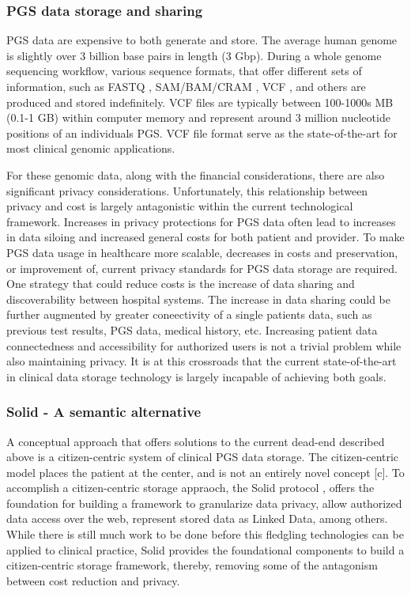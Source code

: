 \documentclass[runningheads]{llncs}
\begin{document}
\subsubsection{PGS data storage and sharing} 
PGS data are expensive to both generate and store. 
The average human genome is slightly over 3 billion base pairs in length (3 Gbp). 
During a whole genome sequencing workflow, various sequence formats, that offer different sets of information, such as FASTQ \cite{cock_sanger_2010}, SAM/BAM/CRAM \cite{li_sequence_2009}\cite{bonfield_cram_2022}, VCF \cite{danecek_variant_2011}, and others are produced and stored indefinitely. 
VCF files are typically between 100-1000s MB (0.1-1 GB) within computer memory and represent around 3 million nucleotide positions of an individual\textquotesingle s PGS. 
VCF file format serve as the state-of-the-art for most clinical genomic applications.

For these genomic data, along with the financial considerations, there are also significant privacy considerations.
Unfortunately, this relationship between privacy and cost is largely antagonistic within the current technological framework.
Increases in privacy protections for PGS data often lead to increases in data siloing and increased general costs for both patient and provider.
To make PGS data usage in healthcare more scalable, decreases in costs and preservation, or improvement of, current privacy standards for PGS data storage are required.
One strategy that could reduce costs is the increase of data sharing and discoverability between hospital systems.
The increase in data sharing could be further augmented by greater coneectivity of a single patient\textquotesingle s data, such as previous test results, PGS data, medical history, etc.
Increasing patient data connectedness and accessibility for authorized users is not a trivial problem while also maintaining privacy.
It is at this crossroads that the current state-of-the-art in clinical data storage technology is largely incapable of achieving both goals.

\subsubsection{Solid - A semantic alternative} 
A conceptual approach that offers solutions to the current dead-end described above is a citizen-centric system of clinical PGS data storage. 
The citizen-centric model places the patient at the center, and is not an entirely novel concept [c].
To accomplish a citizen-centric storage appraoch, the Solid protocol \cite{capadisli_solid_nodate}, offers the foundation for building a framework to granularize data privacy, allow authorized data access over the web, represent stored data as Linked Data, among others. 
While there is still much work to be done before this fledgling technologies can be applied to clinical practice, Solid provides the foundational components to build a citizen-centric storage framework, thereby, removing some of the antagonism between cost reduction and privacy.
\end{document}
